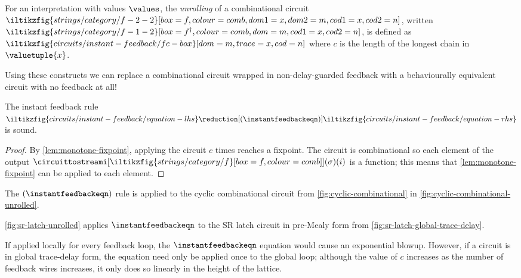 \begin{definition}[Unrolling]\label{def:unrolling}
    For an interpretation with values \(\values\), the \emph{unrolling}
    of a combinational circuit \(
        \iltikzfig{strings/category/f-2-2}[box=f,colour=comb,dom1=x,dom2=m,cod1=x,cod2=n]
    \), written \(
        \iltikzfig{strings/category/f-1-2}[box=f^\dagger,colour=comb,dom=m,cod1=x,cod2=n]
    \), is defined as \(
        \iltikzfig{circuits/instant-feedback/fc-box}[dom=m,trace=x,cod=n]
    \) where \(c\) is the length of the longest chain in \(\valuetuple{x}\).
\end{definition}

Using these constructs we can replace a combinational circuit wrapped in
non-delay-guarded feedback with a behaviourally equivalent circuit with no
feedback at all!

\begin{proposition}\label{prop:instant-feedback}
    The instant feedback rule \(
        \iltikzfig{circuits/instant-feedback/equation-lhs}
        \reduction[(\instantfeedbackeqn)]
        \iltikzfig{circuits/instant-feedback/equation-rhs}
    \) is sound.
\end{proposition}
\begin{proof}
    By \cref{lem:monotone-fixpoint}, applying the circuit \(c\)
    times reaches a fixpoint.
    The circuit is combinational so each element of the output
    \(\circuittostreami[
        \iltikzfig{strings/category/f}[box=f,colour=comb]
    ](\sigma)(i)\) is a function; this means that \cref{lem:monotone-fixpoint}
    can be applied to each element.
\end{proof}

\begin{example}
    The \((\instantfeedbackeqn)\) rule is applied to the cyclic combinational
    circuit from \cref{fig:cyclic-combinational} in
    \cref{fig:cyclic-combinational-unrolled}.
\end{example}



\begin{example}
    \cref{fig:sr-latch-unrolled} applies \(\instantfeedbackeqn\) to the
    SR latch circuit in pre-Mealy form from
    \cref{fig:sr-latch-global-trace-delay}.
\end{example}



If applied locally for every feedback loop, the \(\instantfeedbackeqn\)
equation would cause an exponential blowup.
However, if a circuit is in global trace-delay form, the equation need only be
applied once to the global loop; although the value of \(c\) increases as the
number of feedback wires increases, it only does so linearly in the height of
the lattice.

